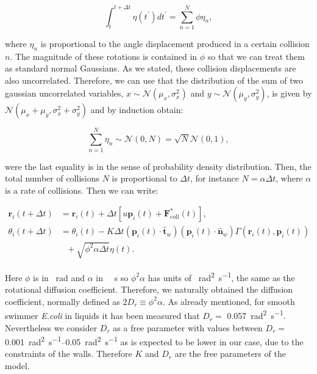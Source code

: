 \begin{equation}
    \int_t^{t+\Delta t}\eta(t^\prime)dt^\prime = \sum_{n=1}^N \phi\eta_n,
\end{equation}

where $\eta_n$ is proportional to the angle displacement produced in a certain collision $n$. The magnitude of these rotations is contained in $\phi$ so that we can treat them as standard normal Gaussians. As we stated, these collision displacements are also uncorrelated. Therefore, we can use that the distribution of the sum of two gaussian uncorrelated variables, $x\sim\mathcal{N}(\mu_x,\sigma_x^2)$ and $y\sim\mathcal{N}(\mu_y,\sigma_y^2)$, is given by $\mathcal{N}(\mu_x+\mu_y,\sigma_x^2+\sigma_y^2)$ and by induction obtain:

\begin{equation}
    \sum_{n=1}^N \eta_n \sim \mathcal{N}(0,N) = \sqrt{N}\mathcal{N}(0,1),
\end{equation}

were the last equality is in the sense of probability density distribution. Then, the total number of collisions $N$ is proportional to $\Delta t$, for instance $N=\alpha \Delta t$, where $\alpha$ is a rate of collisions. Then we can write:

\begin{align}
    \textbf{r}_i(t+\Delta t) &=  \textbf{r}_i(t) + \Delta t[u \textbf{p}_i(t) + \textbf{F}^*_{\text{coll}}(t)], \\
    \label{eq:correct integration}
    \theta_i(t+\Delta t) &=  \theta_i(t) - K\Delta t (\textbf{p}_i(t) \cdot \hat{\textbf{t}}_w)  (\textbf{p}_i(t) \cdot \hat{\textbf{n}}_w) \Gamma(\textbf{r}_i(t), \textbf{p}_i(t)) \nonumber \\
     &\ \ \ + \sqrt{\phi^2\alpha\Delta t} \eta(t).
\end{align}

Here $\phi$ is in \SI{}{\radian} and $\alpha$ in \SI{}{\per\second} so $\phi^2\alpha$ has units of \SI{}{\square\radian\per\second}, the same as the rotational diffusion coefficient. Therefore, we naturally obtained the diffusion coefficient, normally defined as $2D_r\equiv\phi^2 \alpha$. As already mentioned, for smooth swimmer \textit{E.coli} in liquids it has been measured that $D_r=$ \SI[per-mode = symbol]{0.057}{\square\radian \per \second}. Nevertheless we consider $D_r$ as a free parameter with values between $D_r=$ \SIrange[per-mode = symbol, range-units=single
]{0.001}{0.05}{\square\radian \per \second} as is expected to be lower in our case, due to the constraints of the walls. Therefore $K$ and $D_r$ are the free parameters of the model.

